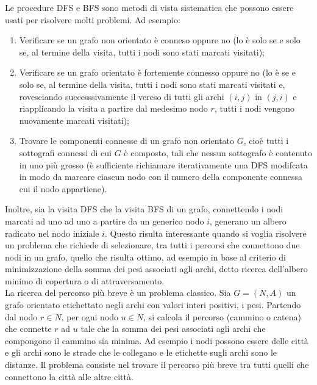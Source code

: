 \documentclass[12pt]{report}
\begin{document}
   	Le procedure DFS e BFS sono metodi di vista sistematica che possono essere usati per risolvere molti problemi. Ad esempio:
   	\begin{enumerate}
   		\item Verificare se un grafo non orientato è conneso oppure no (lo è solo se e solo se, al termine della visita, tutti i nodi sono stati marcati visitati);
   		\item Verificare se un grafo orientato è fortemente connesso oppure no (lo è se e solo se, al termine della visita, tutti i nodi sono stati marcati visitati e, rovesciando successsivamente il vereso di tutti gli archi $(i, j)$ in $(j, i)$ e riapplicando la visita a partire dal medesimo nodo $r$, tutti i nodi vengono nuovamente marcati visitati);
   		\item Trovare le componenti connesse di un grafo non orientato $G$, cioè tutti i sottografi connessi di cui $G$ è composto, tali che nessun sottografo è contenuto in uno più grosso (è sufficiente richiamare iterativamente una DFS modifcata in modo da marcare ciascun nodo con il numero della componente connessa cui il nodo appartiene).
   	\end{enumerate}
   	Inoltre, sia la visita DFS che la visita BFS di un grafo, connettendo i nodi marcati ad uno ad uno a partire da un generico nodo $i$, generano un albero radicato nel nodo iniziale $i$. Questo risulta interessante quando si voglia risolvere un problema che richiede di selezionare, tra tutti i percorsi che connettono due nodi in un grafo, quello che risulta ottimo, ad esempio in base al criterio di minimizzazione della somma dei pesi associati agli archi, detto ricerca dell'albero minimo di copertura o di attraversamento. \\
   	La ricerca del percorso più breve è un problema classico. Sia $G = (N, A)$ un grafo orientato etichettato negli archi con valori interi positivi, i pesi. Partendo dal nodo $r \in N$, per ogni nodo $u \in N$, si calcola il percorso (cammino o catena) che connette $r$ ad $u$ tale che la somma dei pesi associati agli archi che compongono il cammino sia minima. Ad esempio i nodi possono essere delle città e gli archi sono le strade che le collegano e le etichette sugli archi sono le distanze. Il problema consiste nel trovare il percorso più breve tra tutti quelli che connettono la città alle altre città.
\end{document}
